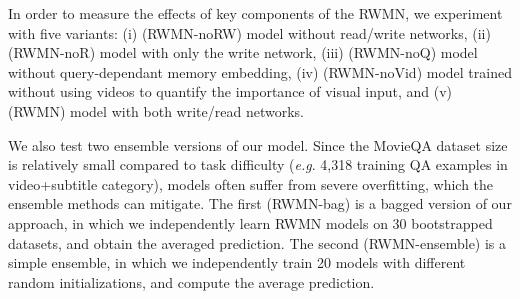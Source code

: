 \documentclass[10pt,twocolumn,letterpaper]{article}
\makeatletter
\theoremstyle{nonumberplain}
\DeclareRobustCommand\onedot{\futurelet\@let@token\@onedot}
\def\onedot{.\@\xspace}
\def\eg{\emph{e.g}\onedot} \def\Eg{\emph{E.g}\onedot}
\makeatother
\begin{document}
\begin{comment}
\textbf{Searching Student} denoted by {\tt SS-*};
A model that matches the subset  of story  to the most similar query  and answer .
They find a window with the highest cosine similarity for  , , and  included in the window while moving a window of a certain size and define it as a score for the corresponding answer.

\textbf{Searching Student with a Convolution Brain} denoted by {\tt SSCB-*};
It is similar to the Searching Student, but the score is not calculated as window and cosine similarity but is trained through the convolution layer.
They construct two matrices with a dot product between  and  and between  and , then concatenate two matrices and learn the score through two convolution operations, mean and max pooling.

\textbf{End2End Memory network} denoted by {\tt MEMN2N}
In order to apply \cite{sukhbaatar2015end} to MovieQA dataset, they share both weight for constructing two memories and weight for obtaining query and answer embedding and use pretrained word embedding.
However, unlike our RWMN, they did not have a Write/Read Network, and they learned video and text embedding with image-sentence ranking model\cite{kiros2014unifying, zhu2015aligning}, not Compact BIlinear Pooling\cite{fukui2016multimodal}.
\end{comment}

In order to measure the effects of key components of the RWMN, 
we experiment with five variants: 
(i) (RWMN-noRW) model without read/write networks, (ii) (RWMN-noR) model with only the write network, (iii) (RWMN-noQ) model without query-dependant memory embedding, (iv) (RWMN-noVid) model trained without using videos to quantify the importance of visual input, and (v) (RWMN) model with both write/read networks.


We also test two ensemble versions of our model.
Since the MovieQA dataset size is relatively small compared to task difficulty (\eg 4,318 training QA examples in video+subtitle category),
models often suffer from severe overfitting, which the ensemble methods can mitigate.
The first (RWMN-bag)  is a bagged version of our approach, in which we independently learn RWMN models on 30 bootstrapped datasets, and obtain the averaged prediction. 
The second (RWMN-ensemble) is a simple ensemble, in which we independently train 20 models with different random initializations, and compute the average prediction. 
\end{document}
